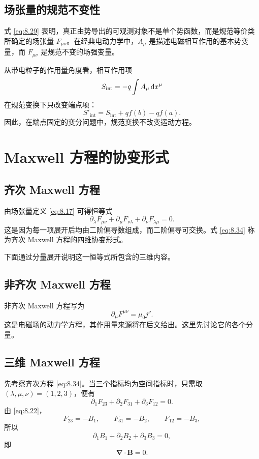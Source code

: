\subsection{场张量的规范不变性}

式 \eqref{eq:8.29} 表明，真正由势导出的可观测对象不是单个势函数，而是规范等价类所确定的场张量 $F_{\mu\nu}$。在经典电动力学中，$A_{\mu}$ 是描述电磁相互作用的基本势变量，而 $F_{\mu\nu}$ 是规范不变的场强变量。

从带电粒子的作用量角度看，相互作用项
\[
S_{\mathrm{int}}=-q\int A_{\mu}\mathop{}\!\mathrm{d} x^{\mu}
\]
在规范变换下只改变端点项：
\[
S'_{\mathrm{int}}
=
S_{\mathrm{int}}+qf(b)-qf(a).
\]
因此，在端点固定的变分问题中，规范变换不改变运动方程。

\section{Maxwell 方程的协变形式}

\subsection{齐次 Maxwell 方程}

由场张量定义 \eqref{eq:8.17} 可得恒等式
\begin{equation}
	\partial_{\lambda}F_{\mu\nu}
	+
	\partial_{\mu}F_{\nu\lambda}
	+
	\partial_{\nu}F_{\lambda\mu}
	=
	0.
	\label{eq:8.34}
\end{equation}
这是因为每一项展开后均由二阶偏导数组成，而二阶偏导可交换。式 \eqref{eq:8.34} 称为齐次 Maxwell 方程的四维协变形式。

下面通过分量展开说明这一恒等式所包含的三维内容。

\subsection{非齐次 Maxwell 方程}

非齐次 Maxwell 方程写为
\begin{equation}
	\partial_{\mu}F^{\mu\nu}
	=
	\mu_{0}j^{\nu}.
	\label{eq:8.36}
\end{equation}
这是电磁场的动力学方程，其作用量来源将在后文给出。这里先讨论它的各个分量。

\subsection{三维 Maxwell 方程}

先考察齐次方程 \eqref{eq:8.34}。当三个指标均为空间指标时，只需取
$(\lambda,\mu,\nu)=(1,2,3)$，便有
\[
\partial_{1}F_{23}
+
\partial_{2}F_{31}
+
\partial_{3}F_{12}
=0.
\]
由 \eqref{eq:8.22}，
\[
F_{23}=-B_{1},
\qquad
F_{31}=-B_{2},
\qquad
F_{12}=-B_{3},
\]
所以
\[
\partial_{1}B_{1}
+
\partial_{2}B_{2}
+
\partial_{3}B_{3}
=0,
\]
即
\[
\bm{\nabla}\cdot\bm{B}=0.
\]

